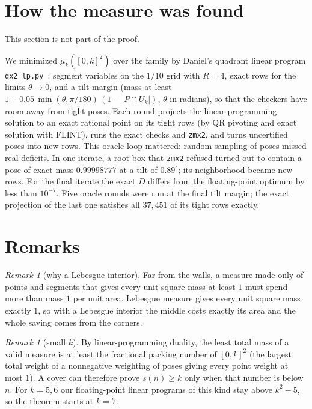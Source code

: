 \documentclass[11pt]{amsart}
\theoremstyle{definition}
\theoremstyle{remark}
\newtheorem{remark}[theorem]{Remark}
\begin{document}
\section{How the measure was found}\label{sec:search}

This section is not part of the proof.

We minimized $\mu_k([0,k]^2)$ over the family by Daniel's quadrant linear program \texttt{qx2\_lp.py}~\cite{daniel}:
segment variables on the $1/10$ grid with $R=4$, exact rows for the limits $\theta\to0$, and a tilt margin (mass at
least $1+0.05\,\min(\theta,\pi/180)\,(1-|P\cap U_k|)$, $\theta$ in radians), so that the checkers have room away from tight poses.
Each round projects the linear-programming solution to an exact rational point on its tight rows (by QR pivoting
and exact solution with FLINT), runs the exact checks and \texttt{zmx2}, and turns uncertified poses into new rows.
This oracle loop mattered: random sampling of poses missed real deficits. In one iterate, a root box that
\texttt{zmx2} refused turned out to contain a pose of exact mass $0.99998777$ at a tilt of $0.89^\circ$; its
neighborhood became new rows. For the final iterate the exact $D$ differs from the floating-point optimum by less
than $10^{-7}$. Five oracle rounds were run at the final tilt margin; the exact projection of the last one
satisfies all $37{,}451$ of its tight rows exactly.

\section{Remarks}\label{sec:remarks}

\begin{remark}[why a Lebesgue interior]
Far from the walls, a measure made only of points and segments that gives every unit square mass at least $1$ must
spend more than mass $1$ per unit area. Lebesgue measure gives every unit square mass exactly $1$, so with a Lebesgue
interior the middle costs exactly its area and the whole saving comes from the corners.
\end{remark}

\begin{remark}[small $k$]\label{rem:small}
By linear-programming duality, the least total mass of a valid measure is at least the fractional packing number of
$[0,k]^2$ (the largest total weight of a nonnegative weighting of poses giving every point weight at most $1$). A
cover can therefore prove $s(n)\ge k$ only when that number is below $n$. For $k=5,6$ our floating-point linear
programs of this kind stay above $k^2-5$, so the theorem starts at $k=7$.
\end{remark}
\end{document}

